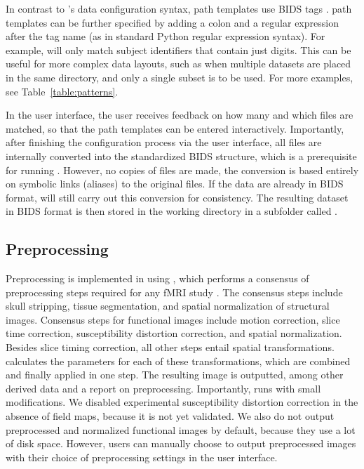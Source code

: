 

In contrast to 's data configuration syntax, 
path templates use BIDS tags \parencite{gorgolewski2016b}. 
path templates can be further specified by adding a colon and a regular
expression after the tag name (as in standard Python regular expression
syntax). For example,  will only match
subject identifiers that contain just digits. This can be useful for more
complex data layouts, such as when multiple datasets are placed in the same
directory, and only a single subset is to be used. For more examples, see
Table~\ref{table:patterns}.

In the  user interface, the user receives feedback on how
many and which files are matched, so that the path templates can be entered
interactively. Importantly, after finishing the configuration process via
the user interface, all files are internally converted into the
standardized BIDS structure, which is a prerequisite for running
. However, no copies of files are made, the conversion is
based entirely on symbolic links (aliases) to the original files. If the
data are already in BIDS format,  will still carry out this
conversion for consistency. The resulting dataset in BIDS format is then
stored in the working directory in a subfolder called .

\subsection{Preprocessing}

Preprocessing is implemented in  using ,
which performs a consensus of preprocessing steps required for any fMRI
study \parencite{esteban2019a}. The consensus steps include skull
stripping, tissue segmentation, and spatial normalization of structural
images. Consensus steps for functional images include motion correction,
slice time correction, susceptibility distortion correction, and spatial
normalization. Besides slice timing correction, all other steps entail
spatial transformations.  calculates the parameters for each
of these transformations, which are combined and finally applied in one
step. The resulting image is outputted, among other derived data and a
report on preprocessing. Importantly,  runs 
with small modifications. We disabled experimental susceptibility
distortion correction in the absence of field maps, because it is not yet
validated. We also do not output preprocessed and normalized functional
images by default, because they use a lot of disk space. However, users can
manually choose to output preprocessed images with their choice of
preprocessing settings in the user interface.

